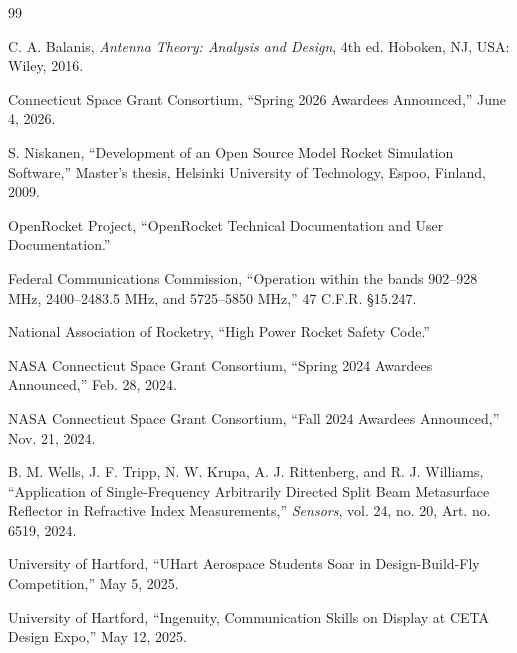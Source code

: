 \documentclass[11pt,twocolumn]{IEEEtran}
\begin{document}
\begin{thebibliography}{99}

C. A. Balanis,
\textit{Antenna Theory: Analysis and Design},
4th ed.
Hoboken, NJ, USA: Wiley, 2016.

Connecticut Space Grant Consortium,
``Spring 2026 Awardees Announced,''
June 4, 2026.

S. Niskanen,
``Development of an Open Source Model Rocket Simulation Software,''
Master's thesis,
Helsinki University of Technology,
Espoo, Finland,
2009.

OpenRocket Project,
``OpenRocket Technical Documentation and User Documentation.''

Federal Communications Commission,
``Operation within the bands 902--928 MHz, 2400--2483.5 MHz, and 5725--5850 MHz,''
47 C.F.R. \S15.247.

National Association of Rocketry,
``High Power Rocket Safety Code.''

NASA Connecticut Space Grant Consortium,
``Spring 2024 Awardees Announced,''
Feb. 28, 2024.

NASA Connecticut Space Grant Consortium,
``Fall 2024 Awardees Announced,''
Nov. 21, 2024.

B. M. Wells, J. F. Tripp, N. W. Krupa, A. J. Rittenberg, and R. J. Williams,
``Application of Single-Frequency Arbitrarily Directed Split Beam Metasurface Reflector in Refractive Index Measurements,''
\textit{Sensors}, vol. 24, no. 20, Art. no. 6519, 2024.

University of Hartford,
``UHart Aerospace Students Soar in Design-Build-Fly Competition,''
May 5, 2025.

University of Hartford,
``Ingenuity, Communication Skills on Display at CETA Design Expo,''
May 12, 2025.

\end{thebibliography}
\end{document}
